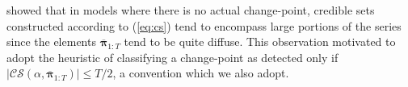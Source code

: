 \cite{Cappello22} showed that in models where there is no actual change-point, credible sets constructed according to (\ref{eq:cs}) tend to encompass large portions of the series since the elements $\overline{\boldsymbol{\pi}}_{1:T}$ tend to be quite diffuse. This observation motivated \cite{Cappello22} to adopt the heuristic of classifying a change-point as detected only if $|\mathcal{CS}(\alpha,\overline{\boldsymbol{\pi}}_{1:T})| \leq T/2$, a convention which we also adopt.